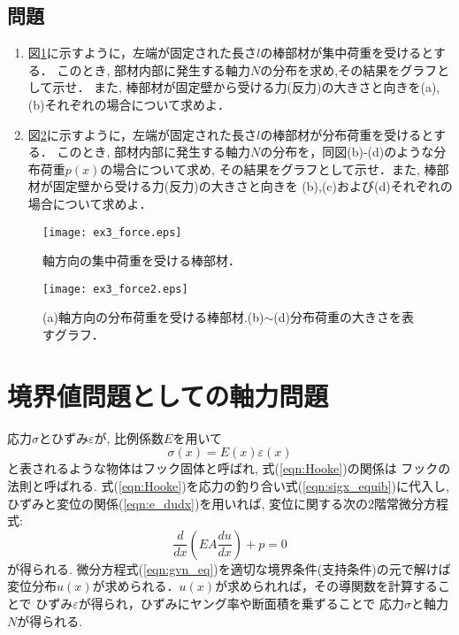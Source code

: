 \documentclass[10pt,a4j]{jbook}
\begin{document}
\subsection{問題}
\begin{enumerate}
\item
図\ref{fig:fig3}に示すように，左端が固定された長さ$l$の棒部材が集中荷重を受けるとする．
このとき, 部材内部に発生する軸力$N$の分布を求め,その結果をグラフとして示せ．
また, 棒部材が固定壁から受ける力(反力)の大きさと向きを(a),(b)それぞれの場合について求めよ．
\item
図\ref{fig:fig3_2}に示すように，左端が固定された長さ$l$の棒部材が分布荷重を受けるとする．
このとき, 部材内部に発生する軸力$N$の分布を，同図(b)-(d)のような分布荷重$p(x)$の場合について求め,
その結果をグラフとして示せ．また, 棒部材が固定壁から受ける力(反力)の大きさと向きを
(b),(c)および(d)それぞれの場合について求めよ．
\end{enumerate}
\begin{figure}[h]
	\begin{center}
	\texttt{[image: ex3\_force.eps]} 
	\end{center}
	\caption{軸方向の集中荷重を受ける棒部材．} 
	\label{fig:fig3}
\end{figure}
\begin{figure}[h]
	\begin{center}
	\texttt{[image: ex3\_force2.eps]} 
	\end{center}
	\caption{(a)軸方向の分布荷重を受ける棒部材.(b)$\sim$(d)分布荷重の大きさを表すグラフ．} 
	\label{fig:fig3_2}
\end{figure}
\section{境界値問題としての軸力問題}
応力$\sigma$とひずみ$\varepsilon$が, 比例係数$E$を用いて
\begin{equation}
	\sigma(x) =E(x) \varepsilon (x)
	\label{eqn:Hooke}
\end{equation}
と表されるような物体はフック固体と呼ばれ, 式(\ref{eqn:Hooke})の関係は
フックの法則と呼ばれる. 式(\ref{eqn:Hooke})を応力の釣り合い式(\ref{eqn:sigx_equib})に代入し, 
ひずみと変位の関係(\ref{eqn:e_dudx})を用いれば, 
変位に関する次の2階常微分方程式:
\begin{equation}
	\frac{d}{dx}\left( EA \frac{du}{dx} \right)+p=0
	\label{eqn:gvn_eq}
\end{equation}
が得られる. 微分方程式(\ref{eqn:gvn_eq})を適切な境界条件(支持条件)の元で解けば
変位分布$u(x)$が求められる．$u(x)$が求められれば，その導関数を計算することで
ひずみ$\varepsilon$が得られ，ひずみにヤング率や断面積を乗ずることで
応力$\sigma$と軸力$N$が得られる.
\end{document}
